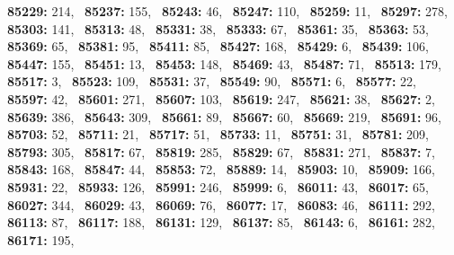 \textbf{85229:} 214,\allowbreak~ 
\textbf{85237:} 155,\allowbreak~ 
\textbf{85243:} 46,\allowbreak~ 
\textbf{85247:} 110,\allowbreak~ 
\textbf{85259:} 11,\allowbreak~ 
\textbf{85297:} 278,\allowbreak~ 
\textbf{85303:} 141,\allowbreak~ 
\textbf{85313:} 48,\allowbreak~ 
\textbf{85331:} 38,\allowbreak~ 
\textbf{85333:} 67,\allowbreak~ 
\textbf{85361:} 35,\allowbreak~ 
\textbf{85363:} 53,\allowbreak~ 
\textbf{85369:} 65,\allowbreak~ 
\textbf{85381:} 95,\allowbreak~ 
\textbf{85411:} 85,\allowbreak~ 
\textbf{85427:} 168,\allowbreak~ 
\textbf{85429:} 6,\allowbreak~ 
\textbf{85439:} 106,\allowbreak~ 
\textbf{85447:} 155,\allowbreak~ 
\textbf{85451:} 13,\allowbreak~ 
\textbf{85453:} 148,\allowbreak~ 
\textbf{85469:} 43,\allowbreak~ 
\textbf{85487:} 71,\allowbreak~ 
\textbf{85513:} 179,\allowbreak~ 
\textbf{85517:} 3,\allowbreak~ 
\textbf{85523:} 109,\allowbreak~ 
\textbf{85531:} 37,\allowbreak~ 
\textbf{85549:} 90,\allowbreak~ 
\textbf{85571:} 6,\allowbreak~ 
\textbf{85577:} 22,\allowbreak~ 
\textbf{85597:} 42,\allowbreak~ 
\textbf{85601:} 271,\allowbreak~ 
\textbf{85607:} 103,\allowbreak~ 
\textbf{85619:} 247,\allowbreak~ 
\textbf{85621:} 38,\allowbreak~ 
\textbf{85627:} 2,\allowbreak~ 
\textbf{85639:} 386,\allowbreak~ 
\textbf{85643:} 309,\allowbreak~ 
\textbf{85661:} 89,\allowbreak~ 
\textbf{85667:} 60,\allowbreak~ 
\textbf{85669:} 219,\allowbreak~ 
\textbf{85691:} 96,\allowbreak~ 
\textbf{85703:} 52,\allowbreak~ 
\textbf{85711:} 21,\allowbreak~ 
\textbf{85717:} 51,\allowbreak~ 
\textbf{85733:} 11,\allowbreak~ 
\textbf{85751:} 31,\allowbreak~ 
\textbf{85781:} 209,\allowbreak~ 
\textbf{85793:} 305,\allowbreak~ 
\textbf{85817:} 67,\allowbreak~ 
\textbf{85819:} 285,\allowbreak~ 
\textbf{85829:} 67,\allowbreak~ 
\textbf{85831:} 271,\allowbreak~ 
\textbf{85837:} 7,\allowbreak~ 
\textbf{85843:} 168,\allowbreak~ 
\textbf{85847:} 44,\allowbreak~ 
\textbf{85853:} 72,\allowbreak~ 
\textbf{85889:} 14,\allowbreak~ 
\textbf{85903:} 10,\allowbreak~ 
\textbf{85909:} 166,\allowbreak~ 
\textbf{85931:} 22,\allowbreak~ 
\textbf{85933:} 126,\allowbreak~ 
\textbf{85991:} 246,\allowbreak~ 
\textbf{85999:} 6,\allowbreak~ 
\textbf{86011:} 43,\allowbreak~ 
\textbf{86017:} 65,\allowbreak~ 
\textbf{86027:} 344,\allowbreak~ 
\textbf{86029:} 43,\allowbreak~ 
\textbf{86069:} 76,\allowbreak~ 
\textbf{86077:} 17,\allowbreak~ 
\textbf{86083:} 46,\allowbreak~ 
\textbf{86111:} 292,\allowbreak~ 
\textbf{86113:} 87,\allowbreak~ 
\textbf{86117:} 188,\allowbreak~ 
\textbf{86131:} 129,\allowbreak~ 
\textbf{86137:} 85,\allowbreak~ 
\textbf{86143:} 6,\allowbreak~ 
\textbf{86161:} 282,\allowbreak~ 
\textbf{86171:} 195,\allowbreak~ 
